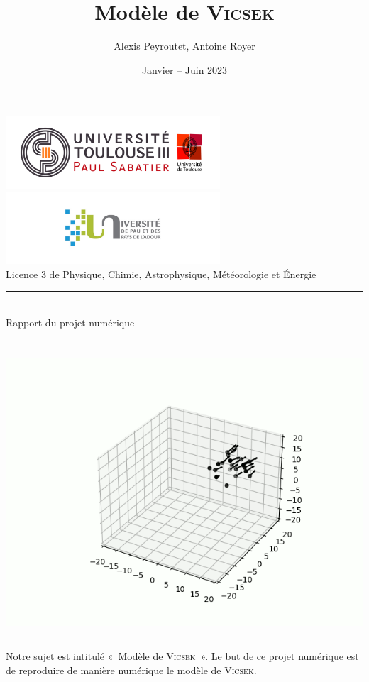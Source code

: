 \documentclass[french, a4paper, 12pt, openany]{report}
\title{\sc Modèle de \textsc{Vicsek}}
\author{Alexis {\sc Peyroutet}, Antoine {\sc Royer}}
\date{Janvier – Juin 2023}
\begin{document}
\makeatletter
\begin{titlepage}
	\centering
	
	\includegraphics[width=8cm]{images/ut3.png} \hfill \includegraphics[width=8cm]{images/uppa.png} \\
	{\large{\sc Licence 3 de Physique, Chimie, Astrophysique, Météorologie et Énergie}} \\
	\rule{0.5\linewidth}{0.4pt} \\
	{\sc Rapport du projet numérique} \\
	
	
	\vfill
	{\huge {\sc \@title}} \\ \vspace{1cm}
	{\Large \@author} \\
	
	\vfill 
	\includegraphics[width=0.7\linewidth]{images/page_garde.png}
	\vfill
	{\Large \@date}
	\rule{\linewidth}{0.4pt}
\end{titlepage}
\makeatother

\tableofcontents



	Notre sujet est intitulé «~Modèle de \textsc{\textsc{Vicsek}}~». Le but de ce projet numérique est de reproduire de manière numérique le modèle de \textsc{\textsc{Vicsek}}.
\end{document}
